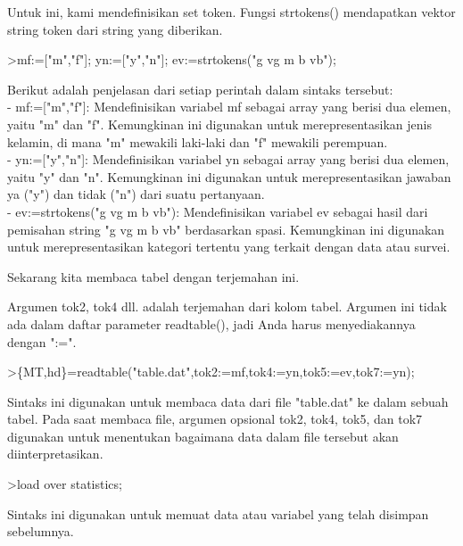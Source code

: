 \documentclass[a4paper,10pt]{article}
\begin{document}
\begin{eulernotebook}
\begin{eulercomment}
\begin{eulercomment}
\begin{eulercomment}
\begin{eulercomment}
\begin{eulercomment}
\begin{eulercomment}
\begin{eulercomment}
\begin{eulercomment}
\begin{eulercomment}
\begin{eulercomment}
\begin{eulercomment}
\begin{eulercomment}
\begin{eulercomment}
\begin{eulercomment}
\begin{eulercomment}
\begin{eulercomment}
\begin{eulercomment}
Untuk ini, kami mendefinisikan set token. Fungsi strtokens()
mendapatkan vektor string token dari string yang diberikan.
\end{eulercomment}
\begin{eulerprompt}
>mf:=["m","f"]; yn:=["y","n"]; ev:=strtokens("g vg m b vb");
\end{eulerprompt}
\begin{eulercomment}
Berikut adalah penjelasan dari setiap perintah dalam sintaks tersebut:\\
- mf:=["m","f"]: Mendefinisikan variabel mf sebagai array yang berisi
dua elemen, yaitu "m" dan "f". Kemungkinan ini digunakan untuk
merepresentasikan jenis kelamin, di mana "m" mewakili laki-laki dan
"f" mewakili perempuan.\\
- yn:=["y","n"]: Mendefinisikan variabel yn sebagai array yang berisi
dua elemen, yaitu "y" dan "n". Kemungkinan ini digunakan untuk
merepresentasikan jawaban ya ("y") dan tidak ("n") dari suatu
pertanyaan.\\
- ev:=strtokens("g vg m b vb"): Mendefinisikan variabel ev sebagai
hasil dari pemisahan string "g vg m b vb" berdasarkan spasi.
Kemungkinan ini digunakan untuk merepresentasikan kategori tertentu
yang terkait dengan data atau survei.

Sekarang kita membaca tabel dengan terjemahan ini.

Argumen tok2, tok4 dll. adalah terjemahan dari kolom tabel. Argumen
ini tidak ada dalam daftar parameter readtable(), jadi Anda harus
menyediakannya dengan ":=".
\end{eulercomment}
\begin{eulerprompt}
>\{MT,hd\}=readtable("table.dat",tok2:=mf,tok4:=yn,tok5:=ev,tok7:=yn);
\end{eulerprompt}
\begin{eulercomment}
Sintaks ini digunakan untuk membaca data dari file "table.dat" ke
dalam sebuah tabel. Pada saat membaca file, argumen opsional tok2,
tok4, tok5, dan tok7 digunakan untuk menentukan bagaimana data dalam
file tersebut akan diinterpretasikan.
\end{eulercomment}
\begin{eulerprompt}
>load over statistics;
\end{eulerprompt}
\begin{eulercomment}
Sintaks ini digunakan untuk memuat data atau variabel yang telah
disimpan sebelumnya.


\end{eulercomment}
\end{eulercomment}
\end{eulercomment}
\end{eulercomment}
\end{eulercomment}
\end{eulercomment}
\end{eulercomment}
\end{eulercomment}
\end{eulercomment}
\end{eulercomment}
\end{eulercomment}
\end{eulercomment}
\end{eulercomment}
\end{eulercomment}
\end{eulercomment}
\end{eulercomment}
\end{eulercomment}
\end{eulernotebook}
\end{document}

